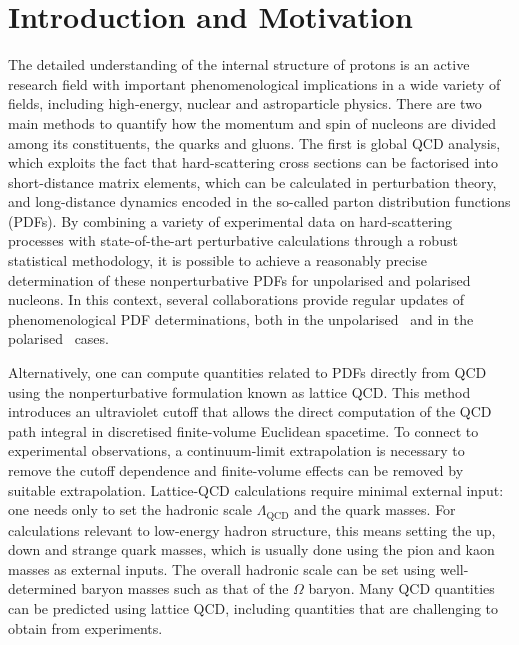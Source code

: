\section{Introduction and Motivation}

The detailed understanding of the internal structure of protons is an active
research field with important phenomenological implications in a wide variety of fields,
including high-energy, nuclear and astroparticle physics.
%
There are two main methods to quantify how the momentum and spin of nucleons
are divided among its constituents, the quarks and gluons.
%
The first is global QCD analysis, which exploits the fact that hard-scattering
cross sections can be factorised into short-distance matrix elements, which can
be calculated in perturbation theory, and long-distance dynamics encoded in the
so-called parton distribution functions (PDFs).
%
By combining a variety of experimental data on hard-scattering processes
with state-of-the-art perturbative calculations through a robust statistical
methodology, it is possible to achieve a reasonably precise determination
of these nonperturbative PDFs for unpolarised and polarised nucleons.
%
In this context, several collaborations provide regular updates of
phenomenological PDF determinations, both
in the unpolarised~\cite{Ball:2012cx,Ball:2014uwa,Harland-Lang:2014zoa,
Dulat:2015mca,Alekhin:2017kpj,Owens:2012bv} and in
the polarised~\cite{Nocera:2014gqa,deFlorian:2009vb} cases.

Alternatively, one can compute quantities related to PDFs directly 
from QCD using the nonperturbative formulation known as lattice QCD.
%
This method introduces an ultraviolet cutoff that allows the direct 
computation of the QCD path integral in discretised finite-volume 
Euclidean spacetime. To connect to experimental observations, a 
continuum-limit extrapolation is necessary to remove the cutoff dependence 
and finite-volume effects can be removed by suitable extrapolation. 
Lattice-QCD calculations require minimal external input: one needs only to 
set the hadronic scale $\Lambda_\text{QCD}$ and the quark masses. 
For calculations relevant to low-energy hadron structure, this means
setting the up, down and strange quark masses,
which is usually done using the pion and kaon masses as external inputs. 
The overall hadronic scale can be set using well-determined baryon masses 
such as that of the $\Omega$ baryon. Many QCD quantities can be predicted 
using lattice QCD, including quantities that are challenging to obtain from experiments. 

